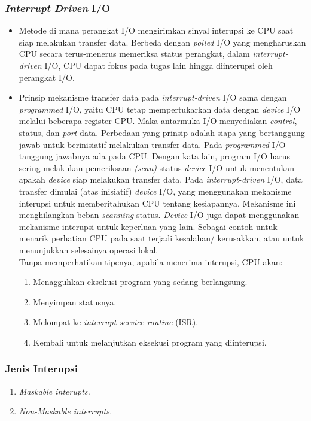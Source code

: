 \documentclass[12pt]{article}
\begin{document}
\subsubsection{\textit{Interrupt Driven} I/O}
   \begin{itemize}
    \item Metode di mana perangkat I/O mengirimkan sinyal interupsi ke CPU
    saat siap melakukan transfer data. Berbeda dengan \textit{polled} I/O yang mengharuskan CPU secara terus-menerus memeriksa status perangkat, dalam \textit{interrupt-driven} I/O, CPU dapat fokus pada tugas lain hingga diinterupsi oleh perangkat I/O.
    \item Prinsip mekanisme transfer data pada \textit{interrupt-driven} I/O sama dengan \textit{programmed} I/O, yaitu CPU tetap mempertukarkan data dengan \textit{device} I/O melalui beberapa register CPU. Maka antarmuka I/O menyediakan \textit{control}, status, dan \textit{port} data. Perbedaan yang prinsip adalah siapa yang bertanggung jawab untuk berinisiatif melakukan transfer data. Pada\textit{ programmed }I/O tanggung jawabnya ada pada CPU. Dengan kata lain, program I/O harus sering melakukan pemeriksaan \textit{(scan)} status\textit{ device }I/O untuk menentukan apakah \textit{device} siap melakukan transfer data. Pada \textit{interrupt-driven} I/O, data transfer dimulai (atas inisiatif) \textit{device }I/O, yang menggunakan mekanisme interupsi untuk memberitahukan CPU tentang kesiapannya. Mekanisme ini menghilangkan beban \textit{scanning} status. \textit{Device} I/O juga dapat menggunakan mekanisme interupsi untuk keperluan yang lain. Sebagai contoh untuk menarik perhatian CPU pada saat terjadi kesalahan/ kerusakkan, atau untuk menunjukkan selesainya operasi lokal.\\
    Tanpa memperhatikan tipenya, apabila menerima interupsi, CPU akan:
\begin{enumerate}
    \item Menagguhkan eksekusi program yang sedang berlangsung.
    \item Menyimpan statusnya.
    \item Melompat ke \textit{interrupt service routine }(ISR).
    \item Kembali untuk melanjutkan eksekusi program yang diinterupsi.
\end{enumerate}
\end{itemize}
\subsubsection{Jenis Interupsi}
\begin{enumerate}
    \item \textit{Maskable interupts.}
    \item \textit{Non-Maskable interrupts.}
\end{enumerate}
\end{document}
